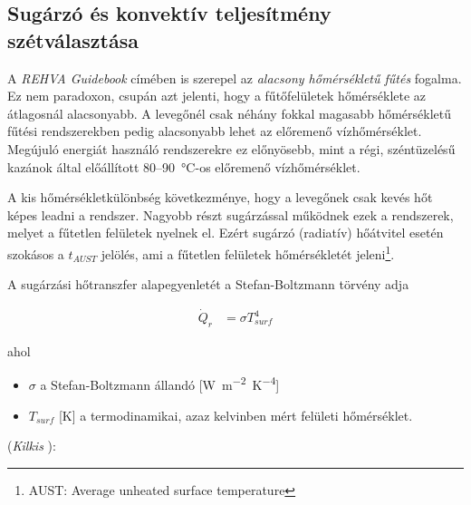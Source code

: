 

\subsection{Sugárzó és konvektív teljesítmény szétválasztása}

A \textit{REHVA Guidebook} \cite{RehvaGuidebookNo7} címében is szerepel az \textit{alacsony hőmérsékletű fűtés} fogalma. Ez nem paradoxon, csupán azt jelenti, hogy a fűtőfelületek hőmérséklete az átlagosnál alacsonyabb. A levegőnél csak néhány fokkal magasabb hőmérsékletű fűtési rendszerekben pedig alacsonyabb lehet az előremenő vízhőmérséklet. Megújuló energiát használó rendszerekre ez előnyösebb, mint a régi, széntüzelésű kazánok által előállított 80--\SI{90}{\celsius}-os előremenő vízhőmérséklet.

A kis hőmérsékletkülönbség következménye, hogy a levegőnek csak kevés hőt képes leadni a rendszer. Nagyobb részt sugárzással működnek ezek a rendszerek, melyet a fűtetlen felületek nyelnek el. Ezért sugárzó (radiatív) hőátvitel esetén szokásos a $t_{AUST}$ jelölés, ami a fűtetlen felületek hőmérsékletét jeleni\footnote{AUST: Average unheated surface temperature}.

A sugárzási hőtranszfer alapegyenletét a Stefan-Boltzmann törvény adja


\begin{equation} \label{eq_stefan_boltzmann}
\begin{aligned}
\dot Q_{r} &= \sigma T_{surf}^4
\end{aligned}
\end{equation}

ahol
\begin{itemize}[itemsep=9pt,topsep=0pt,parsep=0pt,partopsep=0pt]
	\item[] $\sigma$ a Stefan-Boltzmann állandó [\si{W~m^{-2}.K^{-4}}] %
	\item[] $T_{surf}$ [\si{\kelvin}] a termodinamikai, azaz kelvinben mért felületi hőmérséklet.
\end{itemize}


(\textit{Kilkis} \cite{KILKIS1994} ):


